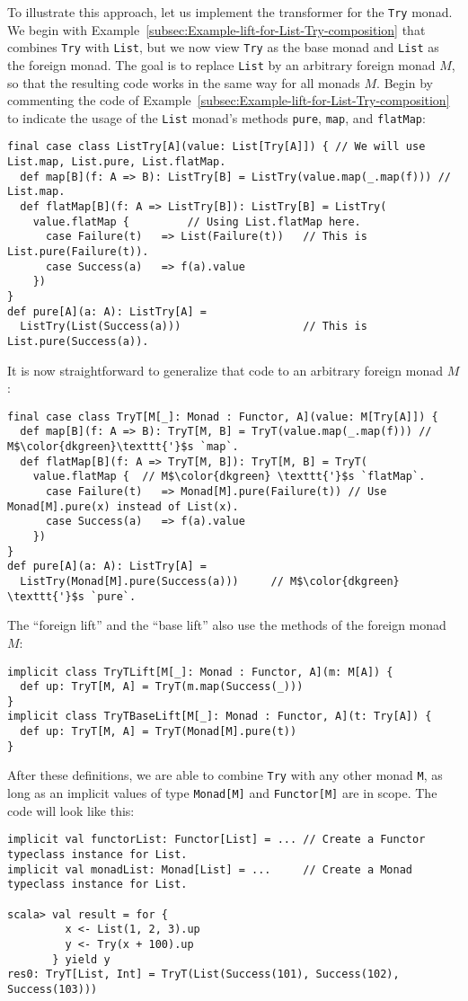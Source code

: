 To illustrate this approach, let us implement the transformer for
the \lstinline!Try! monad. We begin with Example~\ref{subsec:Example-lift-for-List-Try-composition}
that combines \lstinline!Try! with \lstinline!List!, but we now
view \lstinline!Try! as the base monad and \lstinline!List! as the
foreign monad. The goal is to replace \lstinline!List! by an arbitrary
foreign monad $M$, so that the resulting code works in the same way
for all monads $M$. Begin by commenting the code of Example~\ref{subsec:Example-lift-for-List-Try-composition}
to indicate the usage of the \lstinline!List! monad\textsf{'}s methods \lstinline!pure!,
\lstinline!map!, and \lstinline!flatMap!:
\begin{lstlisting}
final case class ListTry[A](value: List[Try[A]]) { // We will use List.map, List.pure, List.flatMap.
  def map[B](f: A => B): ListTry[B] = ListTry(value.map(_.map(f))) // List.map.
  def flatMap[B](f: A => ListTry[B]): ListTry[B] = ListTry(
    value.flatMap {         // Using List.flatMap here.
      case Failure(t)   => List(Failure(t))   // This is List.pure(Failure(t)).
      case Success(a)   => f(a).value
    })
}
def pure[A](a: A): ListTry[A] =
  ListTry(List(Success(a)))                   // This is List.pure(Success(a)).
\end{lstlisting}
It is now straightforward to generalize that code to an arbitrary
foreign monad $M$:
\begin{lstlisting}[mathescape=true]
final case class TryT[M[_]: Monad : Functor, A](value: M[Try[A]]) {
  def map[B](f: A => B): TryT[M, B] = TryT(value.map(_.map(f))) // M$\color{dkgreen}\texttt{'}$s `map`.
  def flatMap[B](f: A => TryT[M, B]): TryT[M, B] = TryT(
    value.flatMap {  // M$\color{dkgreen} \texttt{'}$s `flatMap`.
      case Failure(t)   => Monad[M].pure(Failure(t)) // Use Monad[M].pure(x) instead of List(x).
      case Success(a)   => f(a).value
    })
}
def pure[A](a: A): ListTry[A] =
  ListTry(Monad[M].pure(Success(a)))     // M$\color{dkgreen} \texttt{'}$s `pure`.
\end{lstlisting}
The \textsf{``}foreign lift\textsf{''} and the \textsf{``}base lift\textsf{''} also use the methods
of the foreign monad $M$:
\begin{lstlisting}
implicit class TryTLift[M[_]: Monad : Functor, A](m: M[A]) {
  def up: TryT[M, A] = TryT(m.map(Success(_)))
}
implicit class TryTBaseLift[M[_]: Monad : Functor, A](t: Try[A]) {
  def up: TryT[M, A] = TryT(Monad[M].pure(t))
}
\end{lstlisting}
 After these definitions, we are able to combine \lstinline!Try!
with any other monad \lstinline!M!, as long as an implicit values
of type \lstinline!Monad[M]! and \lstinline!Functor[M]! are in scope.
The code will look like this:
\begin{lstlisting}
implicit val functorList: Functor[List] = ... // Create a Functor typeclass instance for List.
implicit val monadList: Monad[List] = ...     // Create a Monad typeclass instance for List.

scala> val result = for {
         x <- List(1, 2, 3).up
         y <- Try(x + 100).up
       } yield y
res0: TryT[List, Int] = TryT(List(Success(101), Success(102), Success(103)))
\end{lstlisting}

